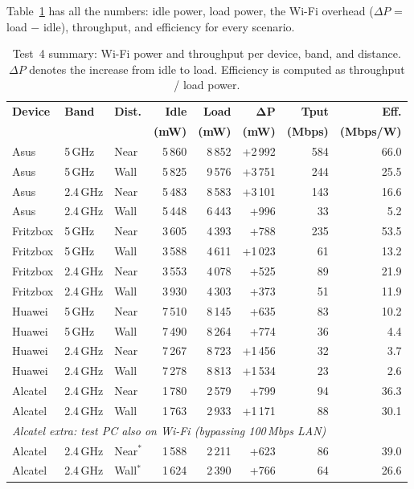 Table~\ref{tab:test4_summary} has all the numbers: idle power, load power, the Wi-Fi overhead ($\Delta P$ = load $-$ idle), throughput, and efficiency for every scenario.

\begin{table}[H]
    \centering
    \caption{Test~4 summary: Wi-Fi power and throughput per device, band, and distance.
    $\Delta P$ denotes the increase from idle to load.
    Efficiency is computed as throughput / load power.}
    \label{tab:test4_summary}
    \footnotesize\renewcommand{\arraystretch}{0.88}\setlength{\tabcolsep}{4pt}
    \begin{tabular}{l l l r r r r r}
        \toprule
        \textbf{Device} & \textbf{Band} & \textbf{Dist.} &
        \textbf{Idle} & \textbf{Load} & $\boldsymbol{\Delta P}$ &
        \textbf{Tput} & \textbf{Eff.} \\
        & & & \textbf{(mW)} & \textbf{(mW)} & \textbf{(mW)} &
        \textbf{(Mbps)} & \textbf{(Mbps/W)} \\
        \midrule
        Asus      & 5\,GHz   & Near & 5\,860 & 8\,852 & +2\,992 & 584  & 66.0 \\
        Asus      & 5\,GHz   & Wall & 5\,825 & 9\,576 & +3\,751 & 244  & 25.5 \\
        Asus      & 2.4\,GHz & Near & 5\,483 & 8\,583 & +3\,101 & 143  & 16.6 \\
        Asus      & 2.4\,GHz & Wall & 5\,448 & 6\,443 & +996    & 33   &  5.2 \\
        \midrule
        Fritzbox  & 5\,GHz   & Near & 3\,605 & 4\,393 & +788    & 235  & 53.5 \\
        Fritzbox  & 5\,GHz   & Wall & 3\,588 & 4\,611 & +1\,023 & 61   & 13.2 \\
        Fritzbox  & 2.4\,GHz & Near & 3\,553 & 4\,078 & +525    & 89   & 21.9 \\
        Fritzbox  & 2.4\,GHz & Wall & 3\,930 & 4\,303 & +373    & 51   & 11.9 \\
        \midrule
        Huawei    & 5\,GHz   & Near & 7\,510 & 8\,145 & +635    & 83   & 10.2 \\
        Huawei    & 5\,GHz   & Wall & 7\,490 & 8\,264 & +774    & 36   &  4.4 \\
        Huawei    & 2.4\,GHz & Near & 7\,267 & 8\,723 & +1\,456 & 32   &  3.7 \\
        Huawei    & 2.4\,GHz & Wall & 7\,278 & 8\,813 & +1\,534 & 23   &  2.6 \\
        \midrule
        Alcatel   & 2.4\,GHz & Near & 1\,780 & 2\,579 & +799    & 94   & 36.3 \\
        Alcatel   & 2.4\,GHz & Wall & 1\,763 & 2\,933 & +1\,171 & 88   & 30.1 \\
        \midrule
        \multicolumn{7}{l}{\textit{Alcatel extra: test PC also on Wi-Fi (bypassing 100\,Mbps \ac{LAN})}} \\
        Alcatel   & 2.4\,GHz & Near$^*$ & 1\,588 & 2\,211 & +623  & 86   & 39.0 \\
        Alcatel   & 2.4\,GHz & Wall$^*$ & 1\,624 & 2\,390 & +766  & 64   & 26.6 \\
        \bottomrule
    \end{tabular}
\end{table}

